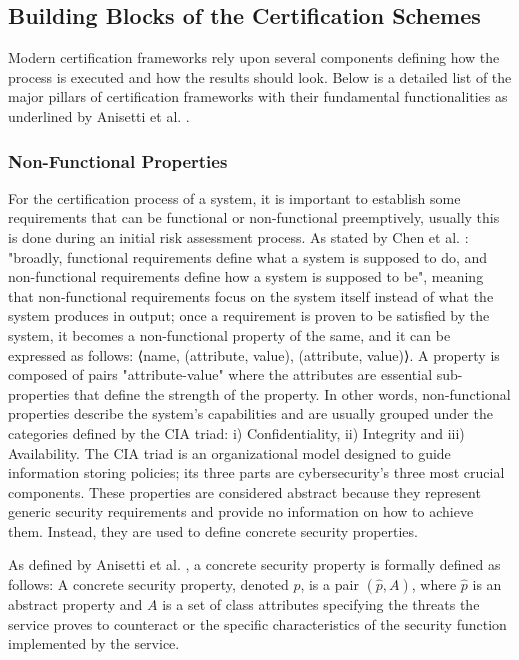 

\subsection{Building Blocks of the Certification Schemes}
Modern certification frameworks rely upon several components defining how the process is executed and how the results should look. Below is a detailed list of the major pillars of certification frameworks with their fundamental functionalities as underlined by Anisetti et al. \cite{anisetti2017semi}\cite{anisetti2022multi}.

\subsubsection{Non-Functional Properties}
For the certification process of a system, it is important to establish some requirements that can be functional or non-functional preemptively, usually this is done during an initial risk assessment process. As stated by Chen et al. \cite{chen2013verification}: "broadly, functional requirements define what a system is supposed to do, and non-functional requirements define how a system is supposed to be", meaning that non-functional requirements focus on the system itself instead of what the system produces in output; once a requirement is proven to be satisfied by the system, it becomes a non-functional property of the same, and it can be expressed as follows: ⟨name, {(attribute, value), (attribute, value)}⟩. A property is composed of pairs "attribute-value" where the attributes are essential sub-properties that define the strength of the property. In other words, non-functional properties describe the system's capabilities and are usually grouped under the categories defined by the CIA triad: i) Confidentiality, ii) Integrity and iii) Availability. The CIA triad is an organizational model designed to guide information storing policies; its three parts are cybersecurity's three most crucial components. These properties are considered abstract because they represent generic security requirements and provide no information on how to achieve them. Instead, they are used to define concrete security properties. 

As defined by Anisetti et al. \cite{anisetti2013test}, a concrete security property is formally defined as follows:
A concrete security property, denoted \(p\), is a pair \( ( \hat{p}, A) \), where \(\hat{p}\) is an abstract property and \(A\) is a set of class attributes specifying the threats the service proves to counteract or the specific characteristics of the security function implemented by the service. 


